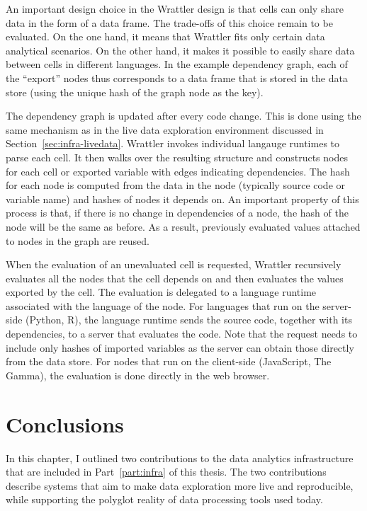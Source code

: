 \documentclass[fleqn,11pt]{report}
\theoremstyle{definition}
\begin{document}
An important design choice in the Wrattler design is that cells can only share data in the form
of a data frame. The trade-offs of this choice remain to be evaluated. On the one hand,
it means that Wrattler fits only certain data analytical scenarios. On the other hand, it
makes it possible to easily share data between cells in different languages. In the
example dependency graph, each of the ``export'' nodes thus corresponds to a data frame that
is stored in the data store (using the unique hash of the graph node as the key).

The dependency graph is updated after every code change. This is done using the same
mechanism as in the live data exploration environment discussed in Section~\ref{sec:infra-livedata}.
Wrattler invokes individual langauge runtimes to parse each cell. It then walks over the
resulting structure and constructs nodes for each cell or exported variable with edges
indicating dependencies. The hash for each node is computed from the data in the node (typically
source code or variable name) and hashes of nodes it depends on. An important property of this
process is that, if there is no change in dependencies of a node, the hash of the node
will be the same as before. As a result, previously evaluated values attached to nodes
in the graph are reused.

When the evaluation of an unevaluated cell is requested, Wrattler recursively evaluates all
the nodes that the cell depends on and then evaluates the values exported by the cell.
The evaluation is delegated to a language runtime associated with the language of the node.
For languages that run on the server-side (Python, R), the language runtime sends the source
code, together with its dependencies, to a server that evaluates the code. Note that the
request needs to include only hashes of imported variables as the server can obtain those
directly from the data store. For nodes that run on the client-side (JavaScript, The Gamma),
the evaluation is done directly in the web browser.

\section{Conclusions}

In this chapter, I outlined two contributions to the data analytics infrastructure that
are included in Part~\ref{part:infra} of this thesis. The two contributions describe systems
that aim to make data exploration more live and reproducible, while supporting the polyglot
reality of data processing tools used today.
\end{document}
